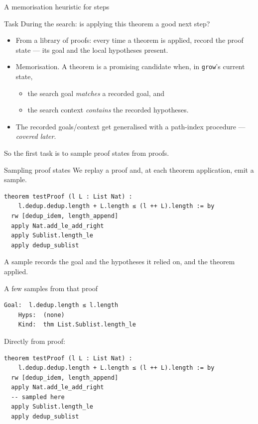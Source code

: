 \documentclass[aspectratio=169]{beamer}
\newcommand{\grow}{\texttt{grow}}      %
\begin{document}
\begin{frame}{A memorisation heuristic for steps}
  \begin{block}{Task}
    During the search: is applying \alert{this theorem} a good next step?
  \end{block}
  \medskip
  \begin{itemize}
    \item From a \alert{library of proofs}: every time a theorem is applied, record
          the proof state --- its \alert{goal} and the \alert{local hypotheses}
          present.
    \item \alert{Memorisation.} A theorem is a promising candidate when, in
          \grow{}'s current state,
      \begin{itemize}
        \item the search goal \emph{matches} a recorded goal, and
        \item the search context \emph{contains} the recorded hypotheses.
      \end{itemize}
    \item The recorded goals/context get \alert{generalised} with a path-index procedure --- \emph{covered later}.
  \end{itemize}
  \medskip
  So the first task is to \alert{sample proof states} from proofs.
\end{frame}

\begin{frame}[fragile]{Sampling proof states}
  We replay a proof and, at \alert{each theorem application}, emit a sample.
\begin{lstlisting}
theorem testProof (l L : List Nat) :
    l.dedup.dedup.length + L.length ≤ (l ++ L).length := by
  rw [dedup_idem, length_append]
  apply Nat.add_le_add_right
  apply Sublist.length_le
  apply dedup_sublist
\end{lstlisting}
  A sample records the \alert{goal} and the
  \alert{hypotheses} it relied on, and the \alert{theorem} applied.
\end{frame}

\begin{frame}[fragile]{A few samples from that proof}
\begin{lstlisting}[basicstyle=\ttfamily\small]
	Goal:  l.dedup.length ≤ l.length
	Hyps:  (none)
	Kind:  thm List.Sublist.length_le
\end{lstlisting}
Directly from proof:
\begin{lstlisting}
theorem testProof (l L : List Nat) :
	l.dedup.dedup.length + L.length ≤ (l ++ L).length := by
  rw [dedup_idem, length_append]
  apply Nat.add_le_add_right
  -- sampled here
  apply Sublist.length_le
  apply dedup_sublist
\end{lstlisting}
\end{frame}
\end{document}
